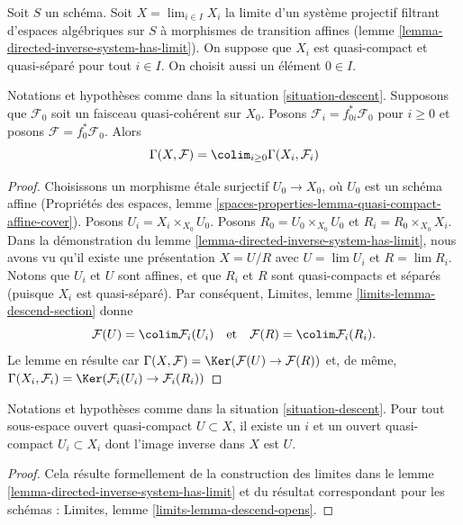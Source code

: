 \begin{situation}
\label{situation-descent}
Soit $S$ un schéma. Soit $X = \lim_{i \in I} X_i$ la limite d'un système projectif
filtrant d'espaces algébriques sur $S$ à morphismes de transition affines
(lemme \ref{lemma-directed-inverse-system-has-limit}).
On suppose que $X_i$ est quasi-compact et quasi-séparé pour tout $i \in I$.
On choisit aussi un élément $0 \in I$.
\end{situation}

\begin{lemma}
\label{lemma-descend-section}
Notations et hypothèses comme dans la situation \ref{situation-descent}.
Supposons que $\mathcal{F}_0$ soit un faisceau quasi-cohérent sur $X_0$.
Posons $\mathcal{F}_i = f_{0i}^*\mathcal{F}_0$ pour $i \geq 0$ et posons
$\mathcal{F} = f_0^*\mathcal{F}_0$. Alors
$$
\Gamma(X, \mathcal{F}) = \colim_{i \geq 0} \Gamma(X_i, \mathcal{F}_i)
$$
\end{lemma}

\begin{proof}
Choisissons un morphisme étale surjectif $U_0 \to X_0$, où $U_0$ est un schéma
affine (Propriétés des espaces, lemme
\ref{spaces-properties-lemma-quasi-compact-affine-cover}).
Posons $U_i = X_i \times_{X_0} U_0$.
Posons $R_0 = U_0 \times_{X_0} U_0$ et $R_i = R_0 \times_{X_0} X_i$.
Dans la démonstration du lemme \ref{lemma-directed-inverse-system-has-limit}, nous avons
vu qu'il existe une présentation $X = U/R$ avec
$U = \lim U_i$ et $R = \lim R_i$.
Notons que $U_i$ et $U$ sont affines, et que $R_i$ et $R$ sont
quasi-compacts et séparés (puisque $X_i$ est quasi-séparé). Par conséquent,
Limites, lemme \ref{limits-lemma-descend-section}
donne
$$
\mathcal{F}(U) = \colim \mathcal{F}_i(U_i)
\quad\text{et}\quad
\mathcal{F}(R) = \colim \mathcal{F}_i(R_i).
$$
Le lemme en résulte car
$\Gamma(X, \mathcal{F}) = \Ker(\mathcal{F}(U) \to \mathcal{F}(R))$
et, de même,
$\Gamma(X_i, \mathcal{F}_i) =
\Ker(\mathcal{F}_i(U_i) \to \mathcal{F}_i(R_i))$
\end{proof}

\begin{lemma}
\label{lemma-descend-opens}
Notations et hypothèses comme dans la situation \ref{situation-descent}.
Pour tout sous-espace ouvert quasi-compact $U \subset X$, il existe un $i$
et un ouvert quasi-compact $U_i \subset X_i$ dont l'image inverse dans $X$ est $U$.
\end{lemma}

\begin{proof}
Cela résulte formellement de la construction des limites dans le
lemme \ref{lemma-directed-inverse-system-has-limit}
et du résultat correspondant pour les schémas :
Limites, lemme \ref{limits-lemma-descend-opens}.
\end{proof}


